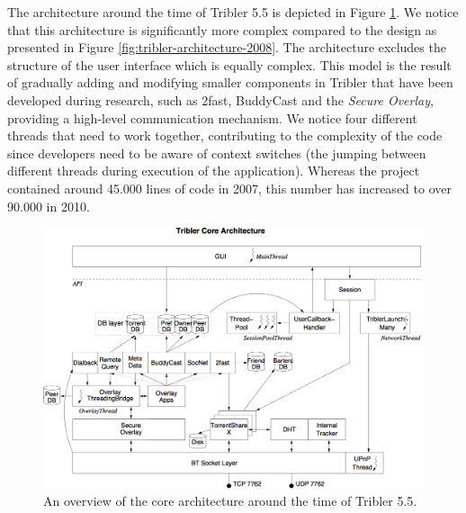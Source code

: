 The architecture around the time of Tribler 5.5 is depicted in Figure \ref{fig:tribler-core-architecture-55}. We notice that this architecture is significantly more complex compared to the design as presented in Figure \ref{fig:tribler-architecture-2008}. The architecture excludes the structure of the user interface which is equally complex. This model is the result of gradually adding and modifying smaller components in Tribler that have been developed during research, such as 2fast, BuddyCast and the \emph{Secure Overlay}, providing a high-level communication mechanism. We notice four different threads that need to work together, contributing to the complexity of the code since developers need to be aware of context switches (the jumping between different threads during execution of the application). Whereas the project contained around 45.000 lines of code in 2007, this number has increased to over 90.000 in 2010.

\begin{figure}[h!]
	\centering
	\includegraphics[width=1.0\columnwidth]{images/architecture/core_architecture_55}
	\caption{An overview of the core architecture around the time of Tribler 5.5.}
	\label{fig:tribler-core-architecture-55}
\end{figure}

